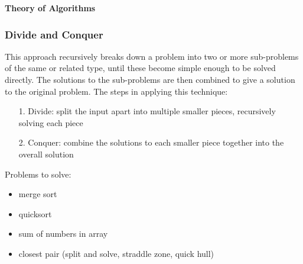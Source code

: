 \documentclass[oneside, 11pt]{book}
\begin{document}
	\thispagestyle{empty} 
	\centering \hspace{-1mm} \vfill {\Huge\bf Theory of Algorithms} 
	\vfill
	\newpage
	\doublespacing
	\setcounter{tocdepth}{3}
	\tableofcontents
	\thispagestyle{empty}
	\newpage
	\setcounter{page}{1}
	\begin{flushleft}
		\subsubsection{Divide and Conquer}
		This approach recursively breaks down a problem into two or more sub-problems of the same or related type, until these become simple enough to be solved directly. The solutions to the sub-problems are then combined to give a solution to the original problem. The steps in applying this technique:
		\begin{itemize}
			\item[1.] Divide: split the input apart into multiple smaller pieces, recursively solving each piece
			\item[2.] Conquer: combine the solutions to each smaller piece together into the overall solution
		\end{itemize}
		Problems to solve:
		\begin{itemize}
			\item merge sort
			\item quicksort
			\item sum of numbers in array
			\item closest pair (split and solve, straddle zone, quick hull)
		\end{itemize}
	\end{flushleft}
\end{document}
